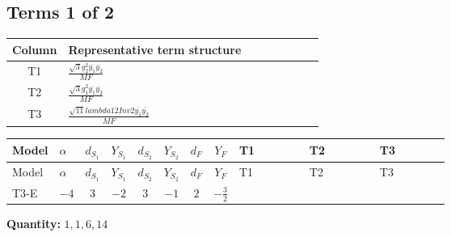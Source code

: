 \documentclass[8pt]{article}
\begin{document}
\begin{landscape}
\subsection*{Terms 1 of 2}
\begin{center}
\begin{tabular}{@{}c >{\raggedright\arraybackslash}p{0.82\linewidth}@{}}
\toprule
Column & Representative term structure \\
\midrule
T1 & \(\displaystyle \frac{\sqrt{3} g_{2}^{2} \overline{y_{1}} \overline{y_{2}}}{MF}\) \\
\midrule
T2 & \(\displaystyle \frac{\sqrt{3} g_{1}^{2} \overline{y_{1}} \overline{y_{2}}}{MF}\) \\
\midrule
T3 & \(\displaystyle \frac{\sqrt{11} lambda12Inv2 \overline{y_{1}} \overline{y_{2}}}{MF}\) \\
\midrule
\bottomrule
\end{tabular}
\end{center}
\smallskip
\tiny
\begin{longtable}{@{}llcccccc >{\raggedright\arraybackslash}p{0.21\linewidth} >{\raggedright\arraybackslash}p{0.21\linewidth} >{\raggedright\arraybackslash}p{0.21\linewidth}@{}}
\toprule
Model & $\alpha$ & $d_{S_1}$ & $Y_{S_1}$ & $d_{S_2}$ & $Y_{S_2}$ & $d_F$ & $Y_F$ & T1 & T2 & T3 \\
\midrule
\endfirsthead
\toprule
Model & $\alpha$ & $d_{S_1}$ & $Y_{S_1}$ & $d_{S_2}$ & $Y_{S_2}$ & $d_F$ & $Y_F$ & T1 & T2 & T3 \\
\midrule
\endhead
T3-E & $-4$ & $3$ & $-2$ & $3$ & $-1$ & $2$ & $-\frac{3}{2}$ & \scriptsize\adjustbox{max width=\linewidth}{$\begin{gathered} - \frac{11 \sqrt{3} g_{2}^{2} \overline{y_{1}} \overline{y_{2}}}{8 MF}\end{gathered}$} & \scriptsize\adjustbox{max width=\linewidth}{$\begin{gathered} - \frac{9 \sqrt{3} g_{1}^{2} \overline{y_{1}} \overline{y_{2}}}{8 MF}\end{gathered}$} & \scriptsize\adjustbox{max width=\linewidth}{$\begin{gathered} - \frac{3 \sqrt{11} lambda12Inv2 \overline{y_{1}} \overline{y_{2}}}{22 MF}\end{gathered}$} \\
\midrule
\bottomrule
\end{longtable}
\clearpage
\noindent\textbf{Quantity: }$\mathrm{1,1,6,14}$\par\smallskip

\end{landscape}
\end{document}
